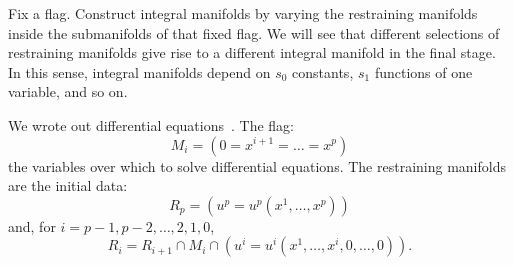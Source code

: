 Fix a flag. 
Construct integral manifolds by varying the restraining manifolds inside the submanifolds of that fixed flag.
We will see that different selections of restraining manifolds give rise to a different integral manifold in the final stage.
In this sense, integral manifolds depend on \(s_0\) constants, \(s_1\) functions of one variable, and so on.
\begin{example}
We wrote out differential equations~. 
The flag:
\[
M_i=(0=x^{i+1}=\dots=x^p)
\]
the variables over which to solve differential equations.
The restraining manifolds are the initial data:
\[
R_p=(u^p=u^p(x^1,\dots,x^p))
\]
and, for \(i=p-1,p-2,\dots,2,1,0\),
\[
R_i=R_{i+1}\cap M_i \cap (u^i=u^i(x^1,\dots,x^i,0,\dots,0)).
\]
\end{example}

